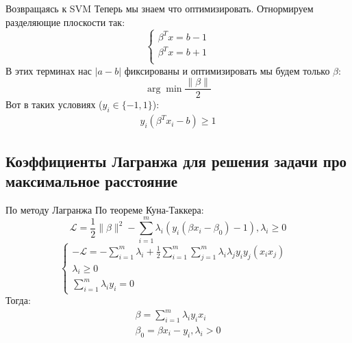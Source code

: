 \documentclass[14pt, fleqn, xcolor={dvipsnames, table}]{beamer}
\begin{document}
\begin{frame}{Возвращаясь к SVM}
\small
Теперь мы знаем что оптимизировать. Отнормируем разделяющие плоскости так:
$$
\left\{\begin{array}{l}
\beta^T x = b - 1 \\
\beta^T x = b + 1 \\
\end{array}\right.
$$
В этих терминах нас $|a - b|$ фиксированы и оптимизировать мы будем только $\beta$:
$$
\arg \min \frac{\|\beta\|}{2}
$$
Вот в таких условиях ($y_i \in \{-1,1\}$):
$$%
\begin{array}{l}
y_i(\beta^T x_i - b) \ge 1
\end{array}
$$
\end{frame}

\subsection{Коэффициенты Лагранжа для решения задачи про максимальное расстояние}
\begin{frame}{По методу Лагранжа}
По теореме Куна-Таккера: \
$$
\mathcal{L} = \frac{1}{2}\|\beta\|^2 - \sum_{i=1}^m\lambda_i(y_i(\beta x_i - \beta_0) - 1), \lambda_i \ge 0
$$ 
$$
\left\{  
  \begin{array}{ll}  
  -\mathcal{L} = -\sum_{i=1}^m\lambda_i + \frac{1}{2}\sum_{i=1}^m\sum_{j=1}^m\lambda_i\lambda_j y_i y_j (x_i x_j) \\  
  \lambda_i \ge 0 & \\
  \sum_{i=1}^m\lambda_i y_i = 0
  \end{array}   
  \right.
$$
Тогда: \
$$\begin{array}{l}
\beta = \sum_{i=1}^m\lambda_i y_i x_i \\
\beta_0 = \beta x_i - y_i, \lambda_i > 0
\end{array}$$
\end{frame}
\end{document}
